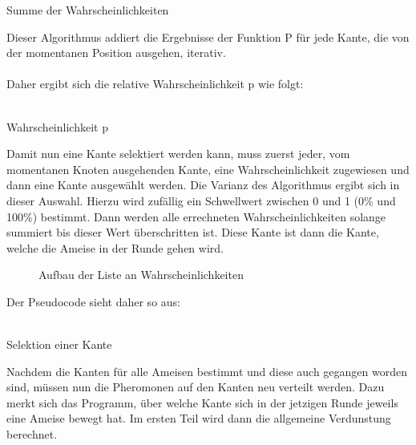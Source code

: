 \documentclass[12pt]{article}
\begin{document}
\begin{algorithm}[H]
\caption{Summe der Wahrscheinlichkeiten}
\DontPrintSemicolon
{}
\end{algorithm}Dieser Algorithmus addiert die Ergebnisse der Funktion P für jede Kante, die von der momentanen Position ausgehen, iterativ.\\\\
Daher ergibt sich die relative Wahrscheinlichkeit p wie folgt:\\\\
\begin{algorithm}[H]
\caption{Wahrscheinlichkeit p}
\DontPrintSemicolon
{}
\end{algorithm}Damit nun eine Kante selektiert werden kann, muss zuerst jeder, vom momentanen Knoten ausgehenden Kante, eine Wahrscheinlichkeit zugewiesen und dann eine Kante ausgewählt werden. Die Varianz des Algorithmus ergibt sich in dieser Auswahl. Hierzu wird zufällig ein Schwellwert zwischen 0 und 1 (0\% und 100\%) bestimmt. Dann werden alle errechneten Wahrscheinlichkeiten solange summiert bis dieser Wert überschritten ist. Diese Kante ist dann die Kante, welche die Ameise in der Runde gehen wird.
\begin{figure}[H]
\centering
{}
\caption{Aufbau der Liste an Wahrscheinlichkeiten}
\label{fig:3}
\end{figure}
Der Pseudocode sieht daher so aus:\\\\
\begin{algorithm}[H]
\caption{Selektion einer Kante}
\DontPrintSemicolon
{}
\end{algorithm}Nachdem die Kanten für alle Ameisen bestimmt und diese auch gegangen worden sind, müssen nun die Pheromonen auf den Kanten neu verteilt werden. Dazu merkt sich das Programm, über welche Kante sich in der jetzigen Runde jeweils eine Ameise bewegt hat. Im ersten Teil wird dann die allgemeine Verdunstung berechnet.\\\\
\end{document}
